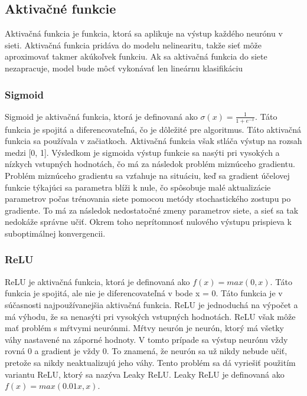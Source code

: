 \subsection{Aktivačné funkcie}\label{subsec:aktivacne_funkcie}

Aktivačná funkcia je funkcia, ktorá sa aplikuje na výstup každého neurónu v sieti.
Aktivačná funkcia pridáva do modelu nelinearitu, takže sieť môže aproximovať
takmer akúkoľvek funkciu. Ak sa aktivačná funkcia do siete nezapracuje, model bude
môcť vykonávať len lineárnu klasifikáciu

\subsubsection{Sigmoid}\label{subsubsec:sigmoid}

Sigmoid je aktivačná funkcia, ktorá je definovaná ako $\sigma(x) = \frac{1}{1 + e^{-x}}$. Táto funkcia je spojitá a diferencovateľná, čo je dôležité pre algoritmus. Táto aktivačná funkcia sa používala v začiatkoch. Aktivačná funkcia však stláča
výstup na rozsah medzi [0, 1]. Výsledkom je sigmoida
výstup funkcie sa nasýti pri vysokých a nízkych vstupných hodnotách, čo má za
následok problém miznúceho gradientu. Problém miznúceho gradientu sa vzťahuje na situáciu,
keď sa gradient účelovej funkcie týkajúci sa parametra blíži k nule, čo spôsobuje malé
aktualizácie parametrov počas trénovania siete pomocou metódy stochastického
zostupu po gradiente. To má za následok nedostatočné zmeny parametrov siete, a sieť
sa tak nedokáže správne učiť. Okrem toho neprítomnosť nulového výstupu prispieva k
suboptimálnej konvergencii.

\subsubsection{ReLU}\label{subsubsec:relu}

ReLU je aktivačná funkcia, ktorá je definovaná ako $f(x) = max(0, x)$. Táto funkcia je spojitá, ale nie je diferencovateľná v bode x = 0. Táto funkcia je v súčasnosti najpoužívanejšia aktivačná funkcia. ReLU je jednoduchá na výpočet a má výhodu, že sa nenasýti pri vysokých vstupných hodnotách. ReLU však môže mať problém s mŕtvymi neurónmi. Mŕtvy neurón je neurón, ktorý má všetky váhy nastavené na záporné hodnoty. V tomto prípade sa výstup neurónu vždy rovná 0 a gradient je vždy 0. To znamená, že neurón sa už nikdy nebude učiť, pretože sa nikdy neaktualizujú jeho váhy. Tento problém sa dá vyriešiť použitím variantu ReLU, ktorý sa nazýva Leaky ReLU. Leaky ReLU je definovaná ako $f(x) = max(0.01x, x)$.


